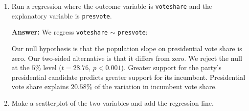 \documentclass[12pt,letterpaper]{article}
\newcommand{\rcode}[2]{}
\newcommand{\answer}{\par\vspace{.18cm}\noindent\textbf{Answer:} }
\begin{document}
\begin{enumerate}[(1)]
\setlength{\itemsep}{4pt}\setlength{\parsep}{2pt}
\item Run a regression where the outcome variable is \texttt{voteshare} and the explanatory variable is \texttt{presvote}.

\answer We regress \texttt{voteshare} $\sim$ \texttt{presvote}:

\rcode{119}{121}

\par\nobreak
{\footnotesize\setlength{\tabcolsep}{4pt}\renewcommand{\arraystretch}{0.93}%
\noindent{}\par}
\smallskip


Our null hypothesis is that the population slope on presidential vote share is zero.
Our two-sided alternative is that it differs from zero. We reject the null at the $5\%$
level ($t = 28.76$, $p < 0.001$). Greater support for the party’s presidential candidate
predicts greater support for its incumbent. Presidential vote share explains $20.58\%$ of
the variation in incumbent vote share.

\item Make a scatterplot of the two variables and add the regression line.


\end{enumerate}
\end{document}
